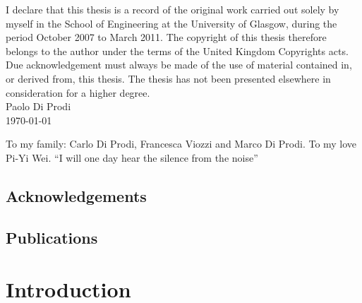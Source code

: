 \documentclass{book}
\begin{document}
\newpage
\begin{minipage}[center]{0.8\textwidth}
I declare that this thesis is a record of the original work carried out solely
by myself in the School of Engineering at the 
University of Glasgow, during the period October 2007 to March 2011.
The copyright of this thesis therefore belongs to the author under the terms
of the United Kingdom Copyrights acts. Due acknowledgement must always be made
of the use of material contained in, or derived from, this thesis.
The thesis has not been presented elsewhere in consideration for a higher
degree.\\
\linebreak[4]
Paolo Di Prodi\\
\linebreak[2]
\today
\end{minipage}

\newpage
\begin{minipage}[center]{1.0\textwidth}
\begin{large}
\begin{center}
To my family: Carlo Di Prodi, Francesca Viozzi 
\linebreak[1]
and Marco Di Prodi.
\linebreak[4]
To my love Pi-Yi Wei.
\linebreak[4]
``I will one day hear the silence from the noise''\end{center}
\end{large}

\end{minipage}

\tableofcontents
\listoftables
\listoffigures
\printnomenclature[1cm]
\newpage
\section*{Acknowledgements}


\newpage

\section*{Publications}


\chapter{Introduction \label{Chapter:Intro}}
\end{document}
